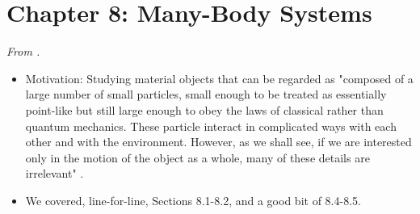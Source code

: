 \documentclass[../notes.tex]{subfiles}
\begin{document}
\section{Chapter 8: Many-Body Systems}
\emph{From \textcite{bib:KibbleBerkshire}.}
\begin{itemize}
    \item {}Motivation: Studying material objects that can be regarded as "composed of a large number of small particles, small enough to be treated as essentially point-like but still large enough to obey the laws of classical rather than quantum mechanics. These particle interact in complicated ways with each other and with the environment. However, as we shall see, if we are interested only in the motion of the object as a whole, many of these details are irrelevant" \parencite[177]{bib:KibbleBerkshire}.
    \item We covered, line-for-line, Sections 8.1-8.2, and a good bit of 8.4-8.5.
\end{itemize}
\end{document}
